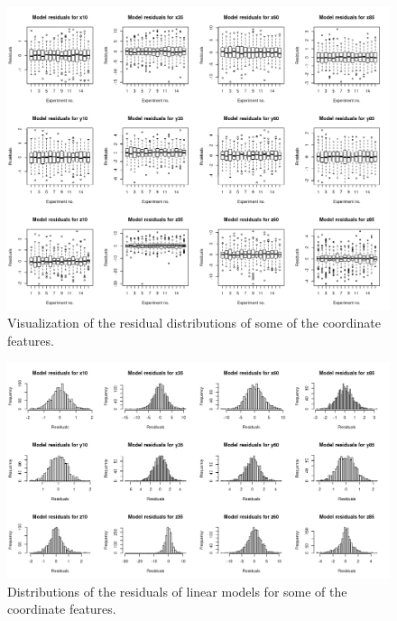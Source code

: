 \documentclass[11pt,fleqn]{article}
\begin{document}
\begin{figure}[H]
	\centering
	\includegraphics[width=\linewidth]{var_experio}
	\caption{Visualization of the residual distributions of some of the coordinate features. }
	\label{fig:vars}
\end{figure}



\begin{figure}[H]
	\centering
	\includegraphics[width=.9\textwidth]{residuals}
	\caption{Distributions of the residuals of linear models for some of the coordinate features.}\label{fig:residuals}
\end{figure}
\end{document}
